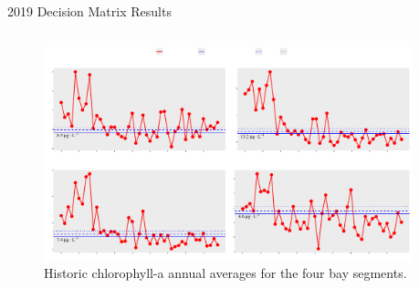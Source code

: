 \documentclass[final,t]{beamer}\usepackage[]{graphicx}\usepackage[]{color}
\begin{document}
\begin{frame}
\begin{columns}[t]
\begin{column}{.65\linewidth}
\begin{block}{2019 Decision Matrix Results}
\begin{minipage}{0.5\textwidth}
\end{minipage}

\end{block}

\vspace{-0.2in}

\begin{columns}[t]



\begin{column}{0.67\textwidth}
\vspace{-0.47cm}
\begin{figure}[htbp]
\includegraphics[trim = 0cm 0cm 0cm 0cm, width=1.1\linewidth]{figure/thrplot.pdf}
\caption{\footnotesize Historic chlorophyll-a annual averages for the four bay segments.}
\label{fig:thrplot}
\end{figure}

\end{column}



\begin{column}{0.28\textwidth}


\end{column}
\end{columns}
\end{column}
\end{columns}
\end{frame}
\end{document}
